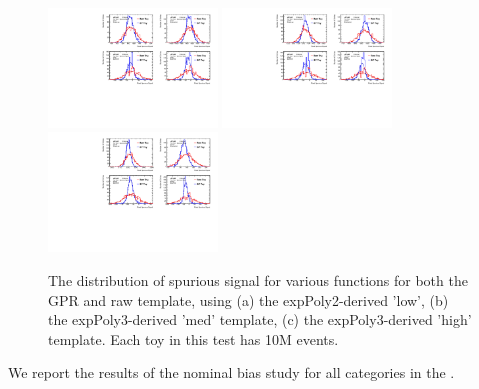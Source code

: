 \begin{figure} 
\begin{center}
  \includegraphics[width=0.4\textwidth]{figures/background/gpr/validation/nominal/ToyTest_FitSigVals_lowpT_10M_noSig}   
  \includegraphics[width=0.4\textwidth]{figures/background/gpr/validation/nominal/ToyTest_FitSigVals_medpT_10M_noSig}   
  \includegraphics[width=0.4\textwidth]{figures/background/gpr/validation/nominal/ToyTest_FitSigVals_highpT_10M_noSig}   
\caption{The distribution of spurious signal for various functions for both the GPR and raw template, using (a) the expPoly2-derived 'low', (b) the expPoly3-derived 'med' template, (c) the expPoly3-derived 'high' template. Each toy in this test has 10M events.}
\label{fig:lowpt_10M_noSig}
\end{center}
\end{figure}

We report the results of the nominal bias study for all categories in the \Tab{\ref{tab:NoSigSS}}.

